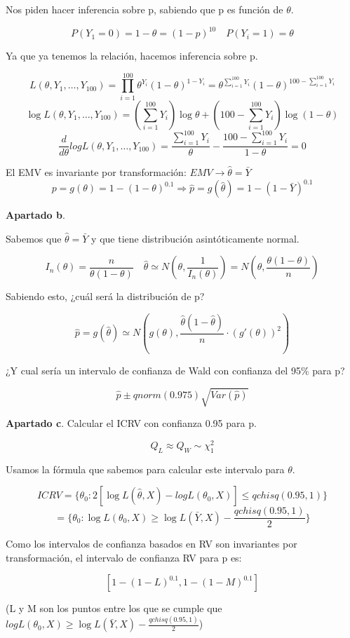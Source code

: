 Nos piden hacer inferencia sobre p, sabiendo que p es función de $\theta$.

\[
P(Y_1=0)=1-\theta=(1-p)^{10} \quad P(Y_i=1)=\theta
\]

Ya que ya tenemos la relación, hacemos inferencia sobre p.

\[
L(\theta,Y_1,\dots,Y_{100})=\prod_{i=1}^{100} \theta^{Y_i}(1-\theta)^{1-Y_i}=\theta^{\sum_{i=1}^{100} Y_i}(1-\theta)^{100-\sum_{i=1}^{100} Y_i}
\]\[ \log L(\theta,Y_1,\dots,Y_{100})=(\sum_{i=1}^{100}Y_i) \log \theta + (100-\sum_{i=1}^{100}Y_i) \log (1-\theta)
\]\[ \frac{d}{d \theta} log L(\theta,Y_1,\dots,Y_{100})= \frac{\sum_{i=1}^{100}Y_i}{\theta} - \frac{100 - \sum_{i=1}^{100}Y_i}{1-\theta}=0
\]

El EMV es invariante por transformación: $EMV \to \widehat{\theta}=\bar{Y}$
\[
    p=g(\theta)=1-(1-\theta)^{0.1}\Longrightarrow \widehat{p}=g(\widehat{\theta})=1-(1-\bar{Y})^{0.1}
\]

\textbf{Apartado b}.

Sabemos que $\widehat{\theta}=\bar{Y}$ y que tiene distribución asintóticamente normal.

\[
I_n(\theta)=\frac{n}{\theta(1-\theta)} \quad \widehat{\theta}\simeq N(\theta,\frac{1}{I_n(\theta)}) = N(\theta,\frac{\theta(1-\theta)}{n})
\]

Sabiendo esto, ¿cuál será la distribución de p?

\[
\widehat{p}=g(\widehat{\theta}) \simeq N(g(\theta),\frac{\widehat{\theta}(1-\widehat{\theta})}{n}\cdot (g'(\theta))^2)
\]

¿Y cual sería un intervalo de confianza de Wald con confianza del 95$\%$ para p?

\[
\widehat{p} \pm qnorm(0.975)\sqrt{Var(\widehat{p})}
\]

\textbf{Apartado c}.
Calcular el ICRV con confianza 0.95 para p.

$$Q_L \approx Q_W \sim \chi^2_1$$

Usamos la fórmula que sabemos para calcular este intervalo para $\theta$.

\[
ICRV=\{ \theta_0:2[\log L(\widehat{\theta},X) - log L(\theta_0,X)] \leq qchisq(0.95,1)\}
\]\[=\{ \theta_0:\log L(\theta_0,X) \geq \log L(\bar{Y},X)-\frac{qchisq(0.95,1)}{2}\}
\]

Como los intervalos de confianza basados en RV son invariantes por transformación, el intervalo de confianza RV para p es:

\[
[1-(1-L)^{0.1},1-(1-M)^{0.1}]
\]

(L y M son los puntos entre los que se cumple que $log L(\theta_0,X) \geq \log L(\bar{Y},X)-\frac{qchisq(0.95,1)}{2}$)

